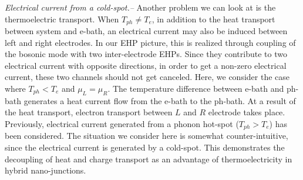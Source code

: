\documentclass[aps
,twocolumn
,floatfix,footinbib,prl
]{revtex4-1}
\begin{document}
\emph{ Electrical current from a cold-spot.--}
Another problem we can look at is the thermoelectric transport. When $T_{ph}\neq T_e$, in addition to the heat transport between system and e-bath, an electrical current may also be induced between left and right electrodes\cite{entinwuhlman2010three,sanchez2011optimal}. In our EHP picture, this is realized through coupling of the bosonic mode with two inter-electrode EHPs. Since they contribute to two electrical current with opposite directions, in order to get a non-zero electrical current, these two channels should not get canceled. Here, we consider the case where $T_{ph}<T_{e}$ and $\mu_L=\mu_R$. The temperature difference between e-bath and ph-bath generates a heat current flow from the e-bath to the ph-bath. At a result of the heat transport, electron transport between $L$ and $R$ electrode takes place. Previously, electrical current generated from a phonon hot-spot ($T_{ph}>T_e$) has been considered\cite{entinwuhlman2010three}. The situation we consider here is somewhat counter-intuitive, since the electrical current is generated by a cold-spot. This demonstrates the decoupling of heat and charge transport as an advantage of thermoelectricity in hybrid nano-junctions.
\end{document}
